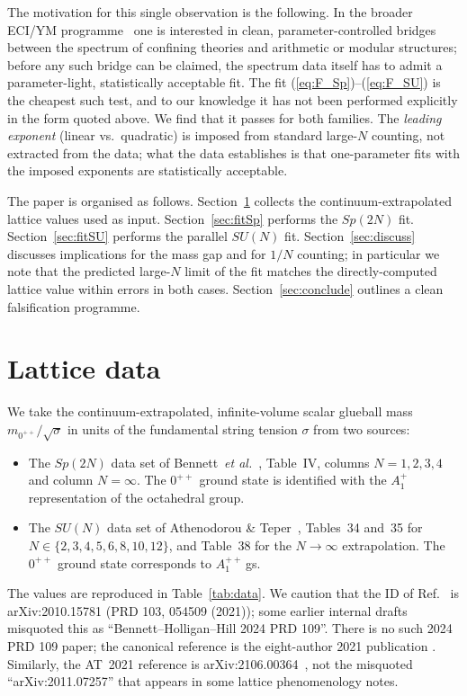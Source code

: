 \documentclass[aps,prd,reprint,nofootinbib,superscriptaddress,floatfix]{revtex4-2}
\begin{document}
The motivation for this single observation is the following. In the broader
ECI/YM programme~\cite{ECI_v15_internal} one is interested in clean,
parameter-controlled bridges between the spectrum of confining theories and
arithmetic or modular structures; before any such bridge can be claimed, the
spectrum data itself has to admit a parameter-light, statistically acceptable
fit. The fit (\ref{eq:F_Sp})--(\ref{eq:F_SU}) is the cheapest such test, and
to our knowledge it has not been performed explicitly in the form quoted
above. We find that it passes for both families. The \emph{leading exponent}
(linear vs.\ quadratic) is imposed from standard large-$N$ counting,
not extracted from the data; what the data establishes is that
one-parameter fits with the imposed exponents are statistically
acceptable.

The paper is organised as follows. Section~\ref{sec:data} collects the
continuum-extrapolated lattice values used as input. Section~\ref{sec:fitSp}
performs the $Sp(2N)$ fit. Section~\ref{sec:fitSU} performs the parallel
$SU(N)$ fit. Section~\ref{sec:discuss} discusses implications for the mass
gap and for $1/N$ counting; in particular we note that the predicted
large-$N$ limit of the fit matches the directly-computed lattice value within
errors in both cases. Section~\ref{sec:conclude} outlines a clean
falsification programme.

\section{Lattice data}\label{sec:data}
We take the continuum-extrapolated, infinite-volume scalar glueball mass
$m_{0^{++}}/\sqrt{\sigma}$ in units of the fundamental string tension
$\sigma$ from two sources:
\begin{itemize}
\item The $Sp(2N)$ data set of Bennett~\emph{et al.}~\cite{BennettHolligan2021},
   Table~IV, columns $N=1,2,3,4$ and column $N=\infty$. The $0^{++}$ ground
   state is identified with the $A_1^{+}$ representation of the octahedral
   group.
\item The $SU(N)$ data set of Athenodorou \& Teper~\cite{AthenodorouTeper2021},
   Tables~34 and~35 for $N \in \{2,3,4,5,6,8,10,12\}$, and Table~38 for the
   $N\to\infty$ extrapolation. The $0^{++}$ ground state corresponds to
   $A_1^{++}$\,gs.
\end{itemize}
The values are reproduced in Table~\ref{tab:data}. We caution that the
ID of Ref.~\cite{BennettHolligan2021} is arXiv:2010.15781 (PRD 103, 054509
(2021)); some earlier internal drafts misquoted this as
``Bennett--Holligan--Hill 2024 PRD 109''. There is no such 2024 PRD 109
paper; the canonical reference is the eight-author 2021 publication
\cite{BennettHolligan2021}. Similarly, the AT~2021 reference is
arXiv:2106.00364~\cite{AthenodorouTeper2021}, not the misquoted
``arXiv:2011.07257'' that appears in some lattice phenomenology notes.
\end{document}
